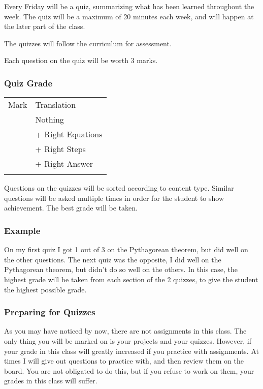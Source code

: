 \documentclass[]{article}
\begin{document}
Every Friday will be a quiz, summarizing what has been learned
throughout the week. The quiz will be a maximum of 20 minutes each week,
and will happen at the later part of the class.

The quizzes will follow the curriculum for assessment.

Each question on the quiz will be worth 3 marks.

\subsubsection{Quiz Grade}\label{quiz-grade}

\begin{longtable}[c]{@{}ll@{}}
\toprule\addlinespace
Mark & Translation
\\\addlinespace
\midrule\endhead
0 & Nothing
\\\addlinespace
1 & + Right Equations
\\\addlinespace
2 & + Right Steps
\\\addlinespace
3 & + Right Answer
\\\addlinespace
\bottomrule
\end{longtable}

Questions on the quizzes will be sorted according to content type.
Similar questions will be asked multiple times in order for the student
to show achievement. The best grade will be taken.

\subsubsection{Example}\label{example}

On my first quiz I got 1 out of 3 on the Pythagorean theorem, but did
well on the other questions. The next quiz was the opposite, I did well
on the Pythagorean theorem, but didn't do so well on the others. In this
case, the highest grade will be taken from each section of the 2
quizzes, to give the student the highest possible grade.

\subsubsection{Preparing for Quizzes}\label{preparing-for-quizzes}

As you may have noticed by now, there are not assignments in this class.
The only thing you will be marked on is your projects and your quizzes.
However, if your grade in this class will greatly increased if you
practice with assignments. At times I will give out questions to
practice with, and then review them on the board. You are not obligated
to do this, but if you refuse to work on them, your grades in this class
will suffer.
\end{document}
